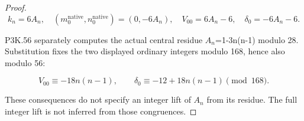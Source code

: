 \begin{proof}
\[
 k_n=6A_n,\quad
 (m_0^{\mathrm{native}},n_0^{\mathrm{native}})=(0,-6A_n),
 \quad V_{00}=6A_n-6,\quad\delta_0=-6A_n-6.           \tag{SQ.21}
\]

P3K.56 separately computes the actual central residue
\(A_{n}\)=1-3n(n-1) modulo 28. Substitution fixes the two displayed
ordinary integers modulo 168, hence also modulo 56:

\[
 V_{00}\equiv-18n(n-1),\qquad
 \delta_0\equiv-12+18n(n-1)\pmod{168}.               \tag{SQ.22}
\]

These consequences do not specify an integer lift of \(A_{n}\) from its
residue. The full integer lift is not inferred from those congruences.
\end{proof}
